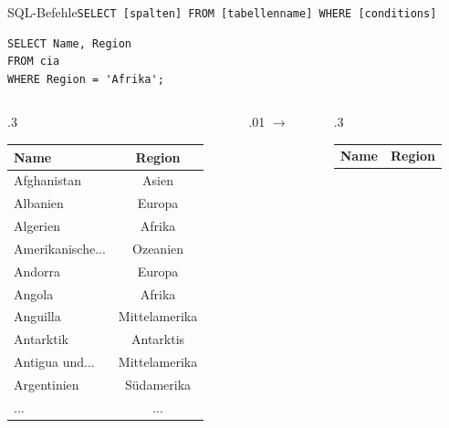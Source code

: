 \begin{frame}[fragile]{SQL-Befehle}{\lstinline|SELECT [spalten] FROM [tabellenname] WHERE [conditions]|}
  \begin{lstlisting}
SELECT Name, Region
FROM cia
WHERE Region = 'Afrika';
\end{lstlisting}

  \begin{columns}[c]
    \centering
    \begin{column}{.3\textwidth}
      \begin{table}
        \centering
        \tiny
        \begin{tabular}{lc}
          \toprule
          \textbf{Name}                & \textbf{Region} \\
          \midrule
          Afghanistan                  & Asien           \\
          Albanien                     & Europa          \\
          \rowcolor[gray]{.8} Algerien & Afrika          \\
          Amerikanische...             & Ozeanien        \\
          Andorra                      & Europa          \\
          \rowcolor[gray]{.8} Angola   & Afrika          \\
          Anguilla                     & Mittelamerika   \\
          Antarktik                    & Antarktis       \\
          Antigua und...               & Mittelamerika   \\
          Argentinien                  & Südamerika      \\
          \midrule
          ...                          & ...             \\
          \bottomrule
        \end{tabular}
      \end{table}
    \end{column}
    \begin{column}{.01\textwidth}
      $\rightarrow$
    \end{column}
    \begin{column}{.3\textwidth}
      \begin{table}
        \centering
        \tiny
        \begin{tabular}{lc}
          \toprule
          \textbf{Name} & \textbf{Region} \\

\end{tabular}
\end{table}
\end{column}
\end{columns}
\end{frame}
